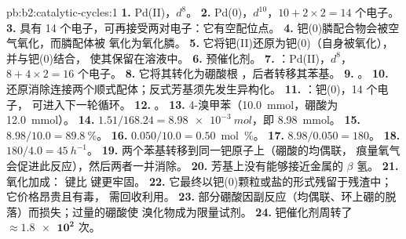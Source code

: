 \begin{solution}{pb:b2:catalytic-cycles:1}
\textbf{1.} Pd(II)，$d^8$。
\textbf{2.} Pd(0)，$d^{10}$，$10 + 2 \times 2 = 14$ 个电子。
\textbf{3.} 具有 14 个电子，可再接受两对电子：它有空配位点。
\textbf{4.} 钯(0)膦配合物会被空气氧化，而膦配体被
氧化为氧化膦。
\textbf{5.} 它将钯(II)还原为钯(0)（自身被氧化），并与钯(0)结合，
使其保留在溶液中。
\textbf{6.} 预催化剂。
\textbf{7.} ：Pd(II)，$d^8$，$8 + 4 \times 2 =
16$ 个电子。
\textbf{8.} 它将其转化为硼酸根 ，后者转移其苯基。
\textbf{9.} 。
\textbf{10.} 还原消除连接两个顺式配体；反式芳基须先发生异构化。
\textbf{11.} ：钯(0)，14 个电子，
可进入下一轮循环。
\textbf{12.} 。
\textbf{13.} 4-溴甲苯（\qty{10.0}{mmol}，硼酸为 \qty{12.0}{mmol}）。
\textbf{14.} $1.51/168.24 = \qty{8.98e-3}{mol}$，即 \qty{8.98}{mmol}。
\textbf{15.} $8.98/10.0 = 89.8~\%$。
\textbf{16.} $0.050/10.0 = 0.50$~mol~\%。
\textbf{17.} $8.98/0.050 = 180$。
\textbf{18.} $180/4.0 = \qty{45}{h^{-1}}$。
\textbf{19.} 两个苯基转移到同一钯原子上（硼酸的均偶联，
痕量氧气会促进此反应），然后两者一并消除。
\textbf{20.} 芳基上没有能够接近金属的 $\beta$ 氢。
\textbf{21.} 氧化加成： 键比  键更牢固。
\textbf{22.} 它最终以钯(0)颗粒或盐的形式残留于残渣中；它价格昂贵且有毒，
需回收利用。
\textbf{23.} 部分硼酸因副反应（均偶联、环上硼的脱落）而损失；过量的硼酸使
溴化物成为限量试剂。
\textbf{24.} 钯催化剂周转了 $\boldsymbol{\approx \num{1.8e2}}$ 次。
\end{solution}
